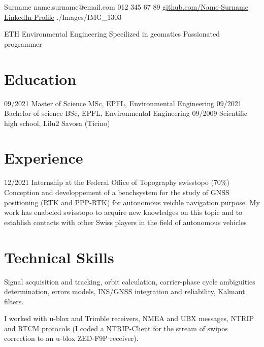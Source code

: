 \documentclass[]{curriculum}
\begin{document}

          {Surname}
          {name.surname@email.com}
          {012 345 67 89}
          {\href{https://github.com/}{github.com/Name-Surname}}
          {\href{https://www.linkedin.com}{LinkedIn Profile}}
          {./Images/IMG_1303}

  \vspace{-10mm}
            {ETH Environmental Engineering}
            {Specilized in geomatics}
            {Passionated programmer}

  \section{Education}

          {09/2021}
          {Master of Science MSc, EPFL, Environmental Engineering}
          {09/2021}
          {Bachelor of science BSc, EPFL, Environmental Engineering}
          {09/2009}
          {Scientific high school, Lilu2 Savosa (Ticino)}

  \section{Experience}

        {12/2021}
        {Internship at the Federal Office of Topography swisstopo (70\%)}
        {Conception and developpement of a benchsystem for the study of GNSS positioning (RTK and PPP-RTK) for autonomous veichle navigation purpose. My work has enabeled swisstopo to acquire new knowledges on this topic and to establish contacts with other Swiss players in the field of autonomous vehicles}

  \section{Technical Skills}

              {Signal acquisition and tracking, orbit calculation, carrier-phase cycle ambiguities determination, errors models, INS/GNSS integration and reliability, Kalmant filters.}

              {I worked with u-blox and Trimble receivers, NMEA and UBX messages, NTRIP and RTCM protocols (I coded a NTRIP-Client for the stream of swipos correction to an u-blox ZED-F9P receiver).}
\end{document}
